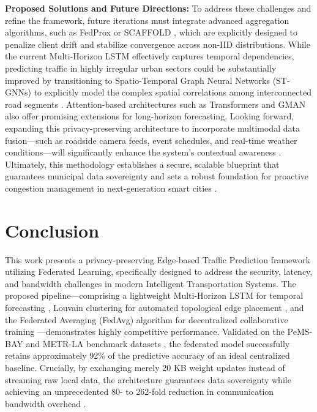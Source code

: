 \documentclass[pdflatex,sn-mathphys-num]{sn-jnl}
\theoremstyle{thmstyleone}
\theoremstyle{thmstyletwo}
\theoremstyle{thmstylethree}
\begin{document}
\textbf{Proposed Solutions and Future Directions:} To address these challenges and refine the framework, future iterations must integrate advanced aggregation algorithms, such as FedProx \cite{li2020fedprox} or SCAFFOLD \cite{karimireddy2020scaffold}, which are explicitly designed to penalize client drift and stabilize convergence across non-IID distributions. While the current Multi-Horizon LSTM effectively captures temporal dependencies, predicting traffic in highly irregular urban sectors could be substantially improved by transitioning to Spatio-Temporal Graph Neural Networks (ST-GNNs) \cite{chen2021tgcn,wu2019gwnet,bai2020adaptive} to explicitly model the complex spatial correlations among interconnected road segments \cite{li2018dcrnn}. Attention-based architectures such as Transformers \cite{vaswani2017attention} and GMAN \cite{zheng2020gman} also offer promising extensions for long-horizon forecasting. Looking forward, expanding this privacy-preserving architecture to incorporate multimodal data fusion---such as roadside camera feeds, event schedules, and real-time weather conditions---will significantly enhance the system's contextual awareness \cite{yao2018deep}. Ultimately, this methodology establishes a secure, scalable blueprint that guarantees municipal data sovereignty and sets a robust foundation for proactive congestion management in next-generation smart cities \cite{ye2020edgefed,chen2019deep}.

\section{Conclusion}

This work presents a privacy-preserving Edge-based Traffic Prediction framework utilizing Federated Learning, specifically designed to address the security, latency, and bandwidth challenges in modern Intelligent Transportation Systems. The proposed pipeline---comprising a lightweight Multi-Horizon LSTM for temporal forecasting \cite{hochreiter1997lstm}, Louvain clustering for automated topological edge placement \cite{blondel2008louvain}, and the Federated Averaging (FedAvg) algorithm for decentralized collaborative training \cite{mcmahan2017fedavg}---demonstrates highly competitive performance. Validated on the PeMS-BAY and METR-LA benchmark datasets \cite{li2018dcrnn}, the federated model successfully retains approximately 92\% of the predictive accuracy of an ideal centralized baseline. Crucially, by exchanging merely 20 KB weight updates instead of streaming raw local data, the architecture guarantees data sovereignty while achieving an unprecedented 80- to 262-fold reduction in communication bandwidth overhead \cite{konecny2016federated}.
\end{document}
